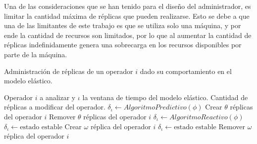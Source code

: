 Una de las consideraciones que se han tenido para el dise\~no del administrador, es limitar la cantidad m\'axima de r\'eplicas que pueden realizarse. Esto se debe a que una de las limitantes de este trabajo es que se utiliza solo una m\'aquina, y por ende la cantidad de recursos son limitados, por lo que al aumentar la cantidad de r\'eplicas indefinidamente genera una sobrecarga en los recursos disponibles por parte de la m\'aquina.

\begin{algorithm}[!ht]
	\caption{Administraci\'on de r\'eplicas de un operador $i$ dado su comportamiento en el modelo el\'astico.}
	\label{alg:administracion}
	\begin{algorithmic}[1]
	\REQUIRE Operador $i$ a analizar y $\iota$ la ventana de tiempo del modelo el\'astico.
	\ENSURE Cantidad de r\'eplicas a modificar del operador.	
		\STATE $\delta_{\iota} \leftarrow AlgoritmoPredictivo(\phi)$
				\RETURN Crear $\theta$ r\'eplicas del operador $i$
			\ENDIF
			\RETURN Remover $\theta$ r\'eplicas del operador $i$
		\ENDIF
	\ELSE[$\iota$ es $T_r$]
		\STATE $\delta_{\iota} \leftarrow AlgoritmoReactivo(\phi)$
				\STATE $\delta_{\iota} \leftarrow \text{estado estable}$ 
				\RETURN Crear $\omega$ r\'eplica del operador $i$
			\ENDIF
			\STATE $\delta_{\iota} \leftarrow \text{estado estable}$ 
			\RETURN Remover $\omega$ r\'eplica del operador $i$
		\ENDIF 
	\ENDIF	
	\end{algorithmic}
\end{algorithm}